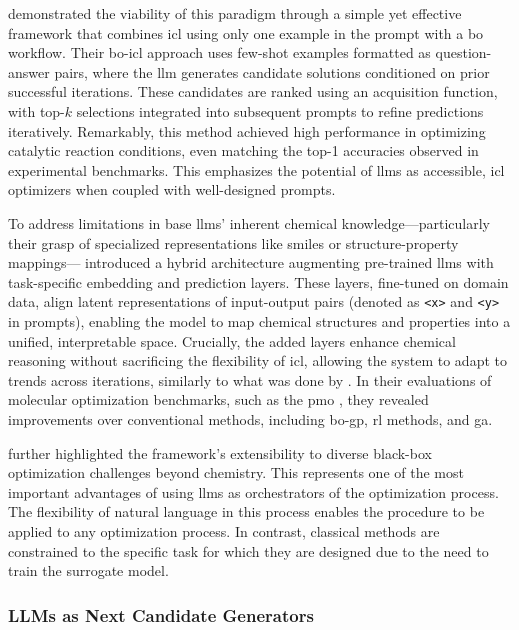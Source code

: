 \textcite{ramos2023bayesian} demonstrated the viability of this paradigm through a simple yet effective framework that combines \gls{icl} using only one example in the prompt with a \gls{bo} workflow. 
Their \gls{bo}-\gls{icl} approach uses few-shot examples formatted as question-answer pairs, where the \gls{llm} generates candidate solutions conditioned on prior successful iterations. 
These candidates are ranked using an acquisition function, with top-$k$ selections integrated into subsequent prompts to refine predictions iteratively. 
Remarkably, this method achieved high performance in optimizing catalytic reaction conditions, even matching the top-1 accuracies observed in experimental benchmarks. This emphasizes the potential of \glspl{llm} as accessible, \gls{icl} optimizers when coupled with well-designed prompts.

To address limitations in base \glspl{llm}’ inherent chemical knowledge---particularly their grasp of specialized representations like \gls{smiles} or structure-property mappings---\textcite{yu2025collaborative} introduced a hybrid architecture augmenting pre-trained \glspl{llm} with task-specific embedding and prediction layers. 
These layers, fine-tuned on domain data, align latent representations of input-output pairs (denoted as \texttt{<x>} and \texttt{<y>} in prompts), enabling the model to map chemical structures and properties into a unified, interpretable space. Crucially, the added layers enhance chemical reasoning without sacrificing the flexibility of \gls{icl}, allowing the system to adapt to trends across iterations, similarly to what was done by \textcite{ramos2023bayesian}. 
In their evaluations of molecular optimization benchmarks, such as the \gls{pmo} \autocite{gao2022sample}, they revealed improvements over conventional methods, including \gls{bo}-\gls{gp}, \gls{rl} methods, and \gls{ga}.

\textcite{yu2025collaborative} further highlighted the framework’s extensibility to diverse black-box optimization challenges beyond chemistry. 
This represents one of the most important advantages of using \glspl{llm} as orchestrators of the optimization process. 
The flexibility of natural language in this process enables the procedure to be applied to any optimization process. 
In contrast, classical methods are constrained to the specific task for which they are designed due to the need to train the surrogate model.

\subsubsection{LLMs as Next Candidate Generators}

